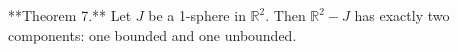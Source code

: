 **Theorem 7.** Let $J$ be a 1-sphere in $\mathbb{R}^2$. Then $\mathbb{R}^2 - J$ has exactly two components: one bounded and one unbounded.
